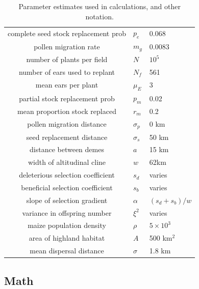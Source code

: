 \begin{table}[htb!!]
  \begin{center}
  \begin{tabular}{|cll|}
    \hline
    complete seed stock replacement prob & $p_e$     & 0.068 \\
    pollen migration rate                & $m_g$      & 0.0083 \\
    number of plants per field           & $N$        & $10^5$ \\
    number of ears used to replant       & $N_f$      & 561 \\
    mean ears per plant                  & $\mu_E$    & 3 \\
    partial stock replacement prob       & $p_m$      & 0.02 \\
    mean proportion stock replaced       & $r_m$      & 0.2 \\
    pollen migration distance            & $\sigma_p$ & 0 km \\
    seed replacement distance            & $\sigma_s$ & 50 km \\
    distance between demes               & $a$        & 15 km \\
    width of altitudinal cline           & $w$        & 62km \\
    deleterious selection coefficient    & $s_d$      & varies \\
    beneficial selection coefficient     & $s_b$      & varies \\
    slope of selection gradient          & $\alpha$   & $(s_d+s_b)/w$ \\
    variance in offspring number         & $\xi^2$    & varies \\
    maize population density             & $\rho$     & $5 \times 10^3$ \\
    area of highland habitat             & $A$        & 500 km$^2$ \\
    mean dispersal distance              & $\sigma$   & 1.8 km \\
    \hline 
  \end{tabular}
\end{center}
  \caption{Parameter estimates used in calculations, and other notation.
  \label{tab:parameters}
  }
\end{table}


\subsection*{Math}


